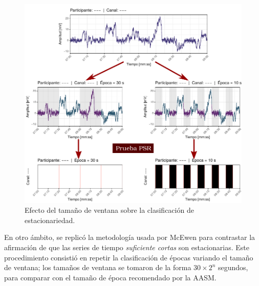 \begin{figure}
\centering
\includegraphics[width=\linewidth]{./img_diagramas/epocas_diferentes_v3.pdf}
\caption{Efecto del tamaño de ventana sobre la clasificación de estacionariedad.}
\label{epocas_diferentes}
\end{figure}

En otro ámbito, se replicó la metodología usada por McEwen \cite{McEwen75} para contrastar la 
afirmación de que las series de tiempo \textit{suficiente cortas} son estacionarias. 
%
Este procedimiento consistió en repetir la clasificación de épocas variando el tamaño de ventana; 
los tamaños de ventana se tomaron de la forma $30 \times 2^{n}$ segundos, para comparar con el 
tamaño de época recomendado por la AASM.


